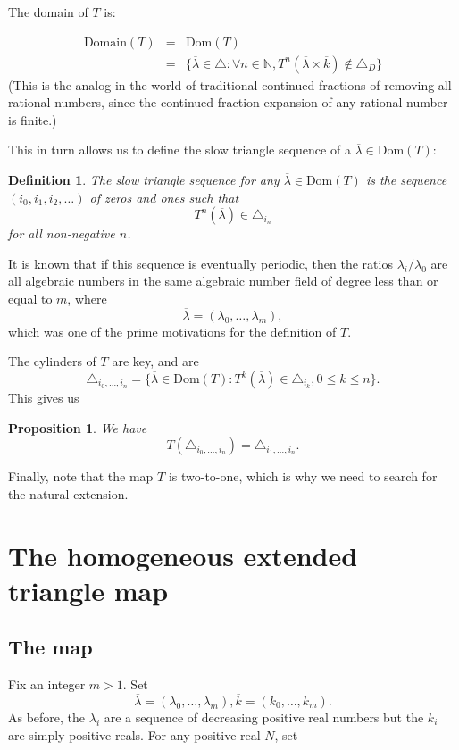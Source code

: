 \documentclass[12pt,oneside,openany]{article}
\newtheorem{prop}[theorem]{Proposition}
\newtheorem{definition}[theorem]{Definition}
\def\N{{\mathbb N}} %
\begin{document}
The  domain of $T$ is:
 
 \begin{eqnarray*}
 \mbox{Domain}(T) &=&  \mbox{Dom}(T) \\
 &=& \{\overline{\lambda}   \in \triangle: \forall n\in \N, T^n (\overline{\lambda} \times \overline{k})\not\in \triangle_D \}
 \end{eqnarray*}
 (This is the analog in the world of traditional continued fractions  of removing all rational numbers, since the continued fraction expansion of any rational number is finite.)
 
 This in turn allows us to define the slow triangle sequence of a $\overline{\lambda}   \in   \mbox{Dom}(T) $:
 
 \begin{definition} The slow triangle sequence for any $\overline{\lambda}   \in   \mbox{Dom}(T) $ is the sequence $(i_0, i_1, i_2, \ldots)$ of zeros and ones such that 
 $$T^n(\overline{\lambda} )  \in   \triangle_{i_n}$$
 for all non-negative $n$.
 \end{definition}
It is known that if this sequence is eventually periodic, then the ratios $\lambda_i/\lambda_0$ are all algebraic numbers in the same algebraic number field of degree less than or equal to $m$, where
$$\overline{\lambda}   =(\lambda_0, \ldots, \lambda_m),$$
which was one of the prime motivations for the definition of $T$.

The cylinders of $T$ are key, and are 
$$\triangle_{i_0, \ldots , i_n} = \{ \overline{\lambda} \in   \mbox{Dom}(T):  T^k(\overline{\lambda} )  \in   \triangle_{i_k}, 0\leq k \leq n\}.$$
This gives us

\begin{prop} We have 
$$  T(\triangle_{i_0, \ldots , i_n} ) = \triangle_{i_1, \ldots , i_n} .$$
\end{prop}
 


Finally, note that the map $T$ is two-to-one, which is why we need to search for the natural extension.







\section{The homogeneous extended triangle map}\label{The homogeneous extended triangle map} 

\subsection{The map}
Fix an integer $m>1$.  
Set
$$\overline{\lambda} =  (\lambda_0, \ldots, \lambda_m), \overline{k} = (k_0, \ldots, k_m). $$
As before,   the $\lambda_i$ are a sequence of decreasing  positive real numbers but the $k_i$  are simply positive reals.
For any positive real $N$, set 
\end{document}
